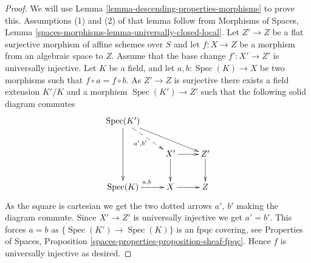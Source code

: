 \documentclass[10pt,a4paper]{amsart}
\theoremstyle{plain}
\theoremstyle{definition}
\theoremstyle{remark}
\numberwithin{equation}{subsection}
\def\Spec{\mathop{\mathrm{Spec}}}
\begin{document}
\begin{proof}
We will use
Lemma \ref{lemma-descending-properties-morphisms}
to prove this. Assumptions (1) and (2) of that lemma follow from
Morphisms of Spaces,
Lemma \ref{spaces-morphisms-lemma-universally-closed-local}.
Let $Z' \to Z$ be a flat surjective morphism of affine schemes
over $S$ and let $f : X \to Z$ be a morphism from an algebraic space to $Z$.
Assume that the base change $f' : X' \to Z'$ is universally injective.
Let $K$ be a field, and let $a, b : \Spec(K) \to X$
be two morphisms such that $f \circ a = f \circ b$.
As $Z' \to Z$ is surjective there exists a field
extension $K'/K$ and a morphism
$\Spec(K') \to Z'$
such that the following solid diagram commutes
$$
\xymatrix{
\Spec(K') \ar[rrd] \ar@{-->}[rd]_{a', b'} \ar[dd] \\
 &
X' \ar[r] \ar[d] &
Z' \ar[d] \\
\Spec(K) \ar[r]^{a, b} &
X \ar[r] &
Z
}
$$
As the square is cartesian we get the two dotted arrows $a'$, $b'$ making the
diagram commute. Since $X' \to Z'$ is universally injective we get $a' = b'$.
This forces $a = b$ as $\{\Spec(K') \to \Spec(K)\}$
is an fpqc covering, see
Properties of Spaces, Proposition
\ref{spaces-properties-proposition-sheaf-fpqc}.
Hence $f$ is universally injective as desired.
\end{proof}
\end{document}
